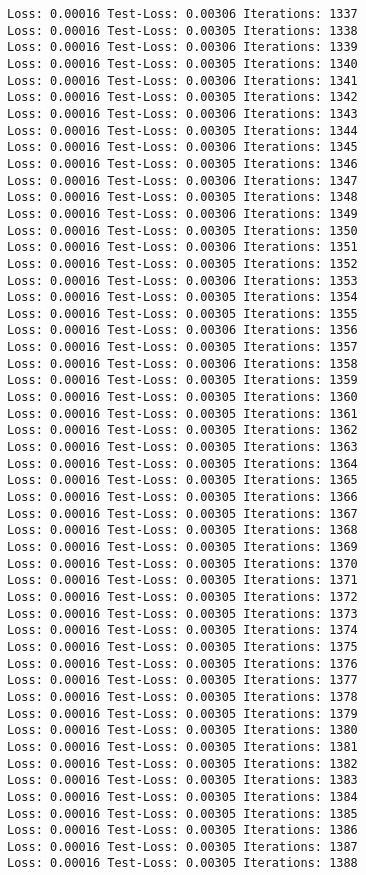 \documentclass[11pt]{article}
\begin{document}
\begin{Verbatim}[commandchars=\\\{\}]
Loss: 0.00016 Test-Loss: 0.00306 Iterations: 1337
Loss: 0.00016 Test-Loss: 0.00305 Iterations: 1338
Loss: 0.00016 Test-Loss: 0.00306 Iterations: 1339
Loss: 0.00016 Test-Loss: 0.00305 Iterations: 1340
Loss: 0.00016 Test-Loss: 0.00306 Iterations: 1341
Loss: 0.00016 Test-Loss: 0.00305 Iterations: 1342
Loss: 0.00016 Test-Loss: 0.00306 Iterations: 1343
Loss: 0.00016 Test-Loss: 0.00305 Iterations: 1344
Loss: 0.00016 Test-Loss: 0.00306 Iterations: 1345
Loss: 0.00016 Test-Loss: 0.00305 Iterations: 1346
Loss: 0.00016 Test-Loss: 0.00306 Iterations: 1347
Loss: 0.00016 Test-Loss: 0.00305 Iterations: 1348
Loss: 0.00016 Test-Loss: 0.00306 Iterations: 1349
Loss: 0.00016 Test-Loss: 0.00305 Iterations: 1350
Loss: 0.00016 Test-Loss: 0.00306 Iterations: 1351
Loss: 0.00016 Test-Loss: 0.00305 Iterations: 1352
Loss: 0.00016 Test-Loss: 0.00306 Iterations: 1353
Loss: 0.00016 Test-Loss: 0.00305 Iterations: 1354
Loss: 0.00016 Test-Loss: 0.00305 Iterations: 1355
Loss: 0.00016 Test-Loss: 0.00306 Iterations: 1356
Loss: 0.00016 Test-Loss: 0.00305 Iterations: 1357
Loss: 0.00016 Test-Loss: 0.00306 Iterations: 1358
Loss: 0.00016 Test-Loss: 0.00305 Iterations: 1359
Loss: 0.00016 Test-Loss: 0.00305 Iterations: 1360
Loss: 0.00016 Test-Loss: 0.00305 Iterations: 1361
Loss: 0.00016 Test-Loss: 0.00305 Iterations: 1362
Loss: 0.00016 Test-Loss: 0.00305 Iterations: 1363
Loss: 0.00016 Test-Loss: 0.00305 Iterations: 1364
Loss: 0.00016 Test-Loss: 0.00305 Iterations: 1365
Loss: 0.00016 Test-Loss: 0.00305 Iterations: 1366
Loss: 0.00016 Test-Loss: 0.00305 Iterations: 1367
Loss: 0.00016 Test-Loss: 0.00305 Iterations: 1368
Loss: 0.00016 Test-Loss: 0.00305 Iterations: 1369
Loss: 0.00016 Test-Loss: 0.00305 Iterations: 1370
Loss: 0.00016 Test-Loss: 0.00305 Iterations: 1371
Loss: 0.00016 Test-Loss: 0.00305 Iterations: 1372
Loss: 0.00016 Test-Loss: 0.00305 Iterations: 1373
Loss: 0.00016 Test-Loss: 0.00305 Iterations: 1374
Loss: 0.00016 Test-Loss: 0.00305 Iterations: 1375
Loss: 0.00016 Test-Loss: 0.00305 Iterations: 1376
Loss: 0.00016 Test-Loss: 0.00305 Iterations: 1377
Loss: 0.00016 Test-Loss: 0.00305 Iterations: 1378
Loss: 0.00016 Test-Loss: 0.00305 Iterations: 1379
Loss: 0.00016 Test-Loss: 0.00305 Iterations: 1380
Loss: 0.00016 Test-Loss: 0.00305 Iterations: 1381
Loss: 0.00016 Test-Loss: 0.00305 Iterations: 1382
Loss: 0.00016 Test-Loss: 0.00305 Iterations: 1383
Loss: 0.00016 Test-Loss: 0.00305 Iterations: 1384
Loss: 0.00016 Test-Loss: 0.00305 Iterations: 1385
Loss: 0.00016 Test-Loss: 0.00305 Iterations: 1386
Loss: 0.00016 Test-Loss: 0.00305 Iterations: 1387
Loss: 0.00016 Test-Loss: 0.00305 Iterations: 1388

\end{Verbatim}
\end{document}

